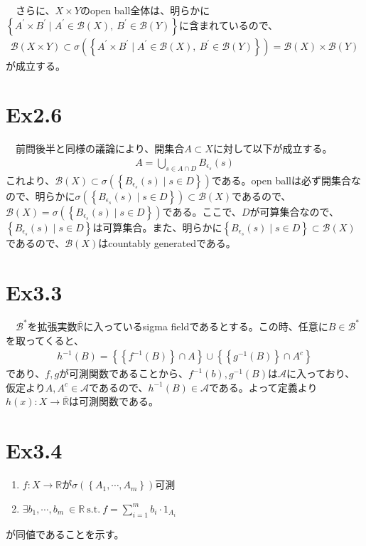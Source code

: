 \documentclass{article}
\begin{document}
　さらに、$X\times Y$のopen ball全体は、明らかに$\left\{ A^{'} \times B^{'} \mid A^{'} \in \mathcal{B}(X),\ B^{'} \in \mathcal{B}(Y) \right\}$に含まれているので、
\begin{align*}
	\mathcal{B}(X\times Y) \subset \sigma\left( \left\{ A^{'} \times B^{'} \mid A^{'} \in \mathcal{B}(X),\ B^{'} \in \mathcal{B}(Y) \right\} \right) = \mathcal{B}(X)\times\mathcal{B}(Y)
\end{align*}
が成立する。

\section{Ex2.6}
　前問後半と同様の議論により、開集合$A\subset X$に対して以下が成立する。
\begin{align*}
	A = \bigcup_{s\in A\cap D} B_{\epsilon_s}(s)
\end{align*}
これより、$\mathcal{B}(X)\subset \sigma\left( \left\{ B_{\epsilon_s}(s)\mid s\in D \right\} \right)$である。open ballは必ず開集合なので、明らかに$\sigma\left( \left\{ B_{\epsilon_s}(s)\mid s\in D \right\} \right) \subset \mathcal{B}(X)$であるので、$\mathcal{B}(X) = \sigma\left( \left\{ B_{\epsilon_s}(s)\mid s\in D \right\} \right)$である。ここで、$D$が可算集合なので、$\left\{ B_{\epsilon_s}(s)\mid s\in D \right\}$は可算集合。また、明らかに$\left\{ B_{\epsilon_s}(s)\mid s\in D \right\} \subset \mathcal{B}(X)$であるので、$\mathcal{B}(X)$はcountably generatedである。


\section{Ex3.3}
　$\mathcal{B}^{*}$を拡張実数$\bar{\mathbb{R}}$に入っているsigma fieldであるとする。この時、任意に$B \in \mathcal{B}^{*}$を取ってくると、
\begin{align*}
	h^{-1}(B) = \left\{ \left\{ f^{-1}(B) \right\}\cap A \right\} \cup \left\{ \left\{ g^{-1}(B) \right\}\cap A^c \right\}
\end{align*}
であり、$f,g$が可測関数であることから、$f^{-1}(b),g^{-1}(B)$は$\mathcal{A}$に入っており、仮定より$A,A^c\in \mathcal{A}$であるので、$h^{-1}(B)\in \mathcal{A}$である。よって定義より$h(x):X\to\bar{\mathbb{R}}$は可測関数である。


\section{Ex3.4}
\begin{enumerate}
	\item $f:X\to\mathbb{R}$が$\sigma\left( \left\{ A_1, \cdots, A_m\right\} \right)$可測
	\item $\exists b_1,\cdots,b_m\ \in \mathbb{R}\ \text{s.t.}\ f = \sum_{i=1}^{m} b_i \cdot 1_{A_i}$
\end{enumerate}
が同値であることを示す。
\end{document}

